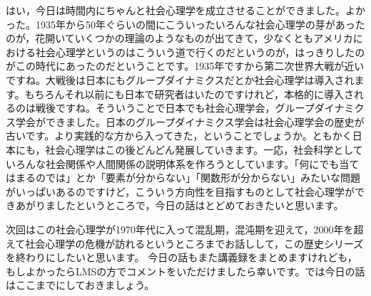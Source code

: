 \documentclass{ltjsbook}
\begin{document}
はい，今日は時間内にちゃんと社会心理学を成立させることができました。よかった。1935年から50年ぐらいの間にこういったいろんな社会心理学の芽があったのが，花開いていくつかの理論のようなものが出てきて，少なくともアメリカにおける社会心理学というのはこういう道で行くのだというのが，はっきりしたのがこの時代にあったのだということです。1935年ですから第二次世界大戦が近いですね。大戦後は日本にもグループダイナミクスだとか社会心理学は導入されます。もちろんそれ以前にも日本で研究者はいたのですけれど，本格的に導入されるのは戦後ですね。そういうことで日本でも社会心理学会，グループダイナミクス学会ができました。日本のグループダイナミクス学会は社会心理学会の歴史が古いです。より実践的な方から入ってきた，ということでしょうか。ともかく日本にも，社会心理学はこの後どんどん発展していきます。一応，社会科学としていろんな社会関係や人間関係の説明体系を作ろうとしています。「何にでも当てはまるのでは」とか「要素が分からない」「関数形が分からない」みたいな問題がいっぱいあるのですけど，こういう方向性を目指すものとして社会心理学ができあがりましたというところで，今日の話はとどめておきたいと思います。


次回はこの社会心理学が1970年代に入って混乱期，混沌期を迎えて，2000年を超えて社会心理学の危機が訪れるというところまでお話しして，この歴史シリーズを終わりにしたいと思います。
今日の話もまた講義録をまとめますけれども，もしよかったらLMSの方でコメントをいただけましたら幸いです。では今日の話はここまでにしておきましょう。
\end{document}
